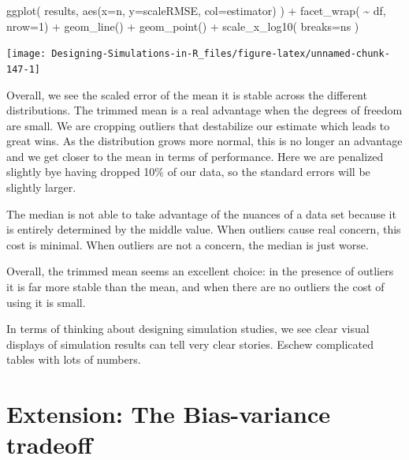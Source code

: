 \documentclass[
]{book}
\newenvironment{Shaded}{\begin{snugshade}}{\end{snugshade}}
\newcommand{\AttributeTok}[1]{\textcolor[rgb]{0.77,0.63,0.00}{#1}}
\newcommand{\DecValTok}[1]{\textcolor[rgb]{0.00,0.00,0.81}{#1}}
\newcommand{\FunctionTok}[1]{\textcolor[rgb]{0.00,0.00,0.00}{#1}}
\newcommand{\NormalTok}[1]{#1}
\newcommand{\SpecialCharTok}[1]{\textcolor[rgb]{0.00,0.00,0.00}{#1}}
\begin{document}
\begin{Shaded}
\begin{Highlighting}[]
\FunctionTok{ggplot}\NormalTok{( results, }\FunctionTok{aes}\NormalTok{(}\AttributeTok{x=}\NormalTok{n, }\AttributeTok{y=}\NormalTok{scaleRMSE, }\AttributeTok{col=}\NormalTok{estimator) ) }\SpecialCharTok{+}
    \FunctionTok{facet\_wrap}\NormalTok{( }\SpecialCharTok{\textasciitilde{}}\NormalTok{ df, }\AttributeTok{nrow=}\DecValTok{1}\NormalTok{) }\SpecialCharTok{+}
    \FunctionTok{geom\_line}\NormalTok{() }\SpecialCharTok{+} \FunctionTok{geom\_point}\NormalTok{() }\SpecialCharTok{+}
    \FunctionTok{scale\_x\_log10}\NormalTok{( }\AttributeTok{breaks=}\NormalTok{ns )}
\end{Highlighting}
\end{Shaded}

\begin{center}\texttt{[image: Designing-Simulations-in-R\_files/figure-latex/unnamed-chunk-147-1]} \end{center}

Overall, we see the scaled error of the mean it is stable across the
different distributions. The trimmed mean is a real advantage when the
degrees of freedom are small. We are cropping outliers that destabilize our
estimate which leads to great wins. As the distribution grows more normal,
this is no longer an advantage and we get closer to the mean in terms of
performance. Here we are penalized slightly bye having dropped 10\% of our
data, so the standard errors will be slightly larger.

The median is not able to take advantage of the nuances of a data set because
it is entirely determined by the middle value. When outliers cause real
concern, this cost is minimal. When outliers are not a concern, the median is
just worse.

Overall, the trimmed mean seems an excellent choice: in the presence of
outliers it is far more stable than the mean, and when there are no outliers
the cost of using it is small.

In terms of thinking about designing simulation studies, we see clear
visual displays of simulation results can tell very clear stories. Eschew
complicated tables with lots of numbers.

\hypertarget{extension-the-bias-variance-tradeoff}{%
\section{Extension: The Bias-variance tradeoff}\label{extension-the-bias-variance-tradeoff}}
\end{document}
